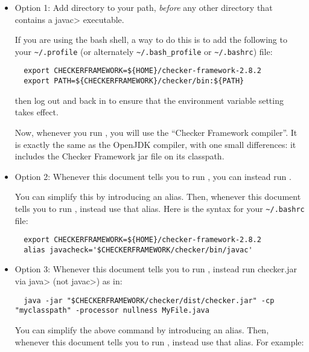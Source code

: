 \begin{itemize}
  \item
    Option 1:
    Add directory
     to your path, \emph{before} any other
    directory that contains a \<javac> executable.

    If you are
    using the bash shell, a way to do this is to add the following to your
    \verb|~/.profile| (or alternately \verb|~/.bash_profile| or \verb|~/.bashrc|) file:
\begin{Verbatim}
  export CHECKERFRAMEWORK=${HOME}/checker-framework-2.8.2
  export PATH=${CHECKERFRAMEWORK}/checker/bin:${PATH}
\end{Verbatim}
    then log out and back in to ensure that the environment variable
    setting takes effect.

    Now, whenever you run , you will use the ``Checker
    Framework compiler''.  It is exactly the same as the OpenJDK compiler,
    with one small differences:  it includes the Checker Framework jar file
    on its classpath.

  \item
    \begin{sloppypar}
    Option 2:
    Whenever this document tells you to run , you
    can instead run .
    \end{sloppypar}

    You can simplify this by introducing an alias.  Then,
    whenever this document tells you to run , instead use that
    alias.  Here is the syntax for your
    \verb|~/.bashrc| file:
\begin{Verbatim}
  export CHECKERFRAMEWORK=${HOME}/checker-framework-2.8.2
  alias javacheck='$CHECKERFRAMEWORK/checker/bin/javac'
\end{Verbatim}

   \item
   Option 3:
   Whenever this document tells you to run , instead
   run checker.jar via \<java> (not \<javac>) as in:

\begin{Verbatim}
  java -jar "$CHECKERFRAMEWORK/checker/dist/checker.jar" -cp "myclasspath" -processor nullness MyFile.java
\end{Verbatim}

    You can simplify the above command by introducing an alias.  Then,
    whenever this document tells you to run , instead use that
    alias.  For example:


\end{itemize}
